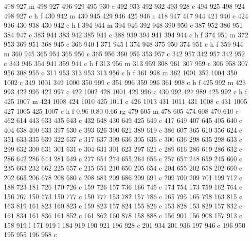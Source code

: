 {{        498 927 m
        498 927 496 929 495 930 c
        492 933 492 932 493 928 c
        494 925 498 924 498 927 c
        h f
        430 942 m
        430 945 429 946 425 946 c
        418 947 417 944 421 940 c
        424 936 430 938 430 942 c
        h f
        394 944 m
        394 946 392 948 390 950 c
        387 952 386 951 384 947 c
        383 944 383 942 385 941 c
        388 939 394 941 394 944 c
        h f
        374 951 m
        372 953 369 951 368 945 c
        366 940 l
        371 945 l
        374 948 375 950 374 951 c
        h f
        359 944 m
        360 945 365 954 365 956 c
        365 956 360 956 353 957 c
        342 957 342 957 342 952 c
        343 946 354 941 359 944 c
        h f
        313 956 m
        313 959 308 961 307 959 c
        306 958 307 956 308 955 c
        311 953 313 953 313 956 c
        h f
        361 998 m
        362 1001 352 1004 350 1002 c
        349 1001 349 1000 350 999 c
        351 996 359 996 361 998 c
        h f
        425 992 m
        423 993 422 995 422 997 c
        422 1002 428 1001 429 996 c
        430 992 427 989 425 992 c
        h f
        425 1007 m
        424 1008 424 1010 425 1011 c
        426 1013 431 1011 431 1008 c
        431 1005 427 1005 425 1007 c
        h f
        0.96 0.80 0.66 rg
        479 605 m
        478 605 474 608 470 610 c
        462 614 443 633 435 643 c
        432 648 430 649 425 649 c
        417 649 407 645 405 640 c
        404 638 400 633 397 630 c
        393 626 390 621 389 619 c
        386 607 365 610 356 624 c
        351 633 335 639 322 637 c
        317 637 309 636 305 636 c
        300 636 298 635 298 633 c
        299 632 300 631 301 631 c
        304 631 301 623 297 621 c
        289 616 286 619 286 632 c
        286 642 286 644 281 649 c
        277 654 274 655 264 656 c
        257 657 248 659 245 660 c
        235 663 232 662 225 657 c
        215 651 210 650 205 654 c
        204 655 202 658 202 660 c
        202 665 206 678 208 680 c
        208 681 209 686 209 691 c
        209 700 209 701 199 712 c
        188 723 181 726 170 726 c
        159 726 157 736 166 745 c
        174 754 173 759 162 764 c
        156 767 150 773 150 777 c
        150 777 153 782 157 786 c
        165 795 165 798 163 815 c
        163 819 161 823 160 823 c
        159 823 157 824 155 826 c
        153 828 153 829 157 832 c
        161 834 161 836 161 852 c
        161 862 160 878 158 888 c
        156 901 156 908 157 913 c
        158 919 l
        171 919 l
        184 919 190 921 196 928 c
        201 934 201 936 197 946 c
        196 950 195 955 196 958 c
}}
